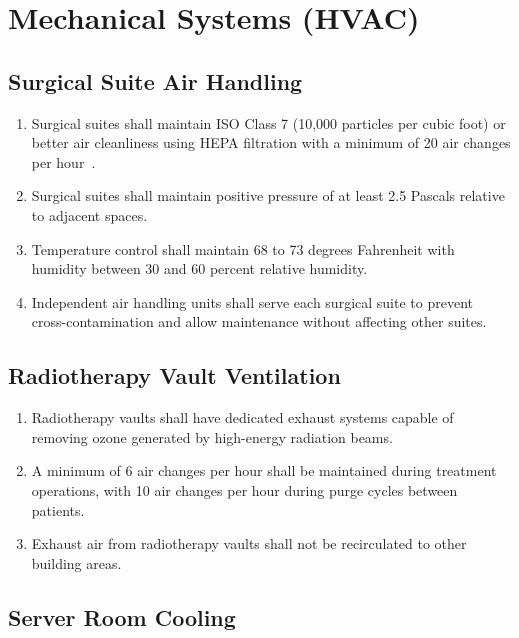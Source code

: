 \section{Mechanical Systems (HVAC)}

\subsection{Surgical Suite Air Handling}

\begin{enumerate}[label=(\alph*)]
\item Surgical suites shall maintain ISO Class 7 (10,000 particles per cubic
  foot) or better air cleanliness using HEPA filtration with a minimum of 20
  air changes per hour~\cite{sitespec2026}.

\item Surgical suites shall maintain positive pressure of at least 2.5 Pascals
  relative to adjacent spaces.

\item Temperature control shall maintain 68 to 73 degrees Fahrenheit with
  humidity between 30 and 60 percent relative humidity.

\item Independent air handling units shall serve each surgical suite to prevent
  cross-contamination and allow maintenance without affecting other suites.
\end{enumerate}

\subsection{Radiotherapy Vault Ventilation}

\begin{enumerate}[label=(\alph*)]
\item Radiotherapy vaults shall have dedicated exhaust systems capable of
  removing ozone generated by high-energy radiation beams.

\item A minimum of 6 air changes per hour shall be maintained during treatment
  operations, with 10 air changes per hour during purge cycles between patients.

\item Exhaust air from radiotherapy vaults shall not be recirculated to other
  building areas.
\end{enumerate}

\subsection{Server Room Cooling}

